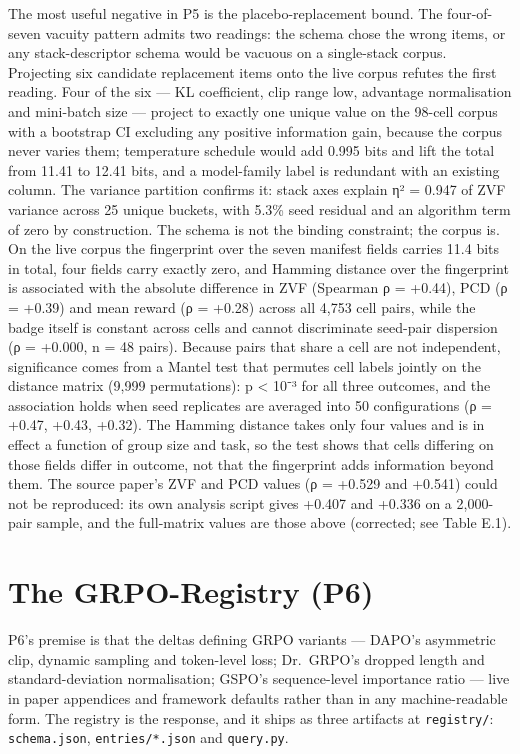\documentclass[12pt,a4paper]{report}
\begin{document}
The most useful negative in P5 is the placebo-replacement bound. The
four-of-seven vacuity pattern admits two readings: the schema chose the
wrong items, or any stack-descriptor schema would be vacuous on a
single-stack corpus. Projecting six candidate replacement items onto the
live corpus refutes the first reading. Four of the six --- KL
coefficient, clip range low, advantage normalisation and mini-batch size
--- project to exactly one unique value on the 98-cell corpus with a
bootstrap CI excluding any positive information gain, because the corpus
never varies them; temperature schedule would add 0.995 bits and lift
the total from 11.41 to 12.41 bits, and a model-family label is
redundant with an existing column. The variance partition confirms it:
stack axes explain η² = 0.947 of ZVF variance across 25 unique buckets,
with 5.3\% seed residual and an algorithm term of zero by construction.
The schema is not the binding constraint; the corpus is. On the live
corpus the fingerprint over the seven manifest fields carries 11.4 bits
in total, four fields carry exactly zero, and Hamming distance over the
fingerprint is associated with the absolute difference in ZVF (Spearman
ρ = +0.44), PCD (ρ = +0.39) and mean reward (ρ = +0.28) across all 4,753
cell pairs, while the badge itself is constant across cells and cannot
discriminate seed-pair dispersion (ρ = +0.000, n = 48 pairs). Because
pairs that share a cell are not independent, significance comes from a
Mantel test that permutes cell labels jointly on the distance matrix
(9,999 permutations): p \textless{} 10⁻³ for all three outcomes, and the
association holds when seed replicates are averaged into 50
configurations (ρ = +0.47, +0.43, +0.32). The Hamming distance takes
only four values and is in effect a function of group size and task, so
the test shows that cells differing on those fields differ in outcome,
not that the fingerprint adds information beyond them. The source
paper's ZVF and PCD values (ρ = +0.529 and +0.541) could not be
reproduced: its own analysis script gives +0.407 and +0.336 on a
2,000-pair sample, and the full-matrix values are those above
(corrected; see Table E.1).

\section{The GRPO-Registry (P6)}\label{the-grpo-registry-p6}

P6's premise is that the deltas defining GRPO variants --- DAPO's
asymmetric clip, dynamic sampling and token-level loss; Dr.~GRPO's
dropped length and standard-deviation normalisation; GSPO's
sequence-level importance ratio \citep{zheng2025gspo} --- live in paper
appendices and framework defaults rather than in any machine-readable
form. The registry is the response, and it ships as three artifacts at
\texttt{registry/}: \texttt{schema.json}, \texttt{entries/*.json} and
\texttt{query.py}.
\end{document}
